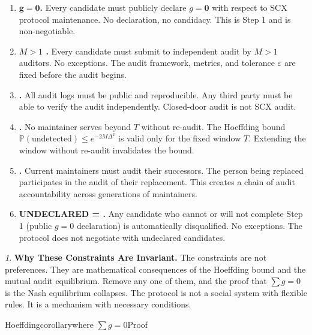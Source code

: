 \documentclass[12pt,a4paper]{article}
\theoremstyle{remark}
\newcommand{\Pbb}{\mathbb{P}}
\newcommand{\rotationPeriod}{T}
\newcommand{\biasParam}{g}
\newtheorem{govinsight}{}[section]
\newenvironment{govbox}{%
  \begin{center}
  \color{insightblue}
  \begin{minipage}{0.92\textwidth}
  \begin{govinsight}
}{%
  \end{govinsight}
  \end{minipage}
  \end{center}
}
\begin{document}
\begin{enumerate}[leftmargin=*]
    \item \textbf{ $\mathbf{g=0}$.}
          Every candidate must publicly declare $\biasParam = \mathbf{0}$
          with respect to SCX protocol maintenance. No declaration, no
          candidacy. This is Step 1 and is non-negotiable.

    \item \textbf{ $M>1$ .}
          Every candidate must submit to independent audit by $M > 1$
          auditors. No exceptions. The audit framework, metrics, and
          tolerance $\varepsilon$ are fixed before the audit begins.

    \item \textbf{.}
          All audit logs must be public and reproducible. Any third party
          must be able to verify the audit independently. Closed-door
          audit is not SCX audit.

    \item \textbf{.}
          No maintainer serves beyond $\rotationPeriod$ without re-audit.
          The Hoeffding bound $\Pbb(\text{undetected}) \leq e^{-2M\Delta^2}$
          is valid only for the fixed window $\rotationPeriod$. Extending
          the window without re-audit invalidates the bound.

    \item \textbf{.}
          Current maintainers must audit their successors. The person being
          replaced participates in the audit of their replacement. This
          creates a chain of audit accountability across generations of
          maintainers.

    \item \textbf{UNDECLARED = .}
          Any candidate who cannot or will not complete Step 1 (public
          $g=0$ declaration) is automatically disqualified. No exceptions.
          The protocol does not negotiate with undeclared candidates.
\end{enumerate}

\begin{govbox}
\textbf{Why These Constraints Are Invariant.}
The constraints are not preferences. They are mathematical consequences of
the Hoeffding bound and the mutual audit equilibrium. Remove any one of them,
and the proof that $\sum g = 0$ is the Nash equilibrium collapses. The
protocol is not a social system with flexible rules. It is a mechanism with
necessary conditions.

\textbf{}
Hoeffdingcorollarywhere
$\sum g = 0$Proof

\end{govbox}
\end{document}
